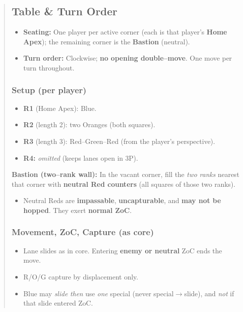 \documentclass[11pt]{article}
\begin{document}
\begin{quote}
\subsection*{Table \& Turn Order}
\begin{itemize}[leftmargin=1.3em,itemsep=0.25em]
  \item \textbf{Seating:} One player per active corner (each is that player’s \textbf{Home Apex}); the remaining corner is the \textbf{Bastion} (neutral).
  \item \textbf{Turn order:} Clockwise; \textbf{no opening double–move}. One move per turn throughout.
\end{itemize}

\subsubsection*{Setup (per player)}
\begin{itemize}[leftmargin=1.3em,itemsep=0.25em]
  \item \textbf{R1} (Home Apex): Blue.
  \item \textbf{R2} (length 2): two Oranges (both squares).
  \item \textbf{R3} (length 3): Red–Green–Red (from the player’s perspective).
  \item \textbf{R4:} \emph{omitted} (keeps lanes open in 3P).
\end{itemize}
\noindent \textbf{Bastion (two–rank wall):} In the vacant corner, fill the \emph{two ranks} nearest that corner with \textbf{neutral Red counters} (all squares of those two ranks).
\begin{itemize}[leftmargin=1.3em,itemsep=0.25em]
  \item Neutral Reds are \textbf{impassable}, \textbf{uncapturable}, and \textbf{may not be hopped}. They exert \textbf{normal ZoC}.
\end{itemize}

\subsubsection*{Movement, ZoC, Capture (as core)}
\begin{itemize}[leftmargin=1.3em,itemsep=0.25em]
  \item Lane slides as in core. Entering \textbf{enemy or neutral} ZoC ends the move. 
  \item R/O/G capture by displacement only.
  \item Blue may \emph{slide then} use \emph{one} special (never special$\to$slide), and \emph{not} if that slide entered ZoC.
\end{itemize}


\end{quote}
\end{document}

